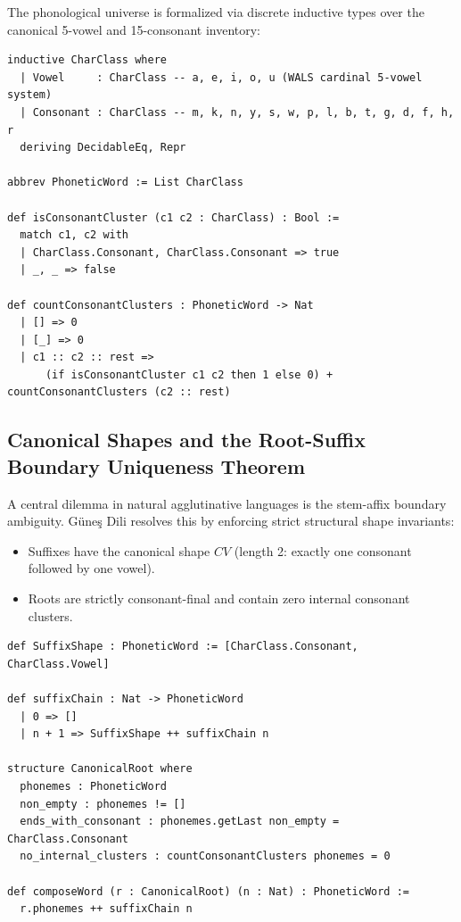 \documentclass[11pt,letterpaper]{article}
\begin{document}
The phonological universe is formalized via discrete inductive types over the canonical 5-vowel and 15-consonant inventory:
\begin{lstlisting}[language=Lean]
inductive CharClass where
  | Vowel     : CharClass -- a, e, i, o, u (WALS cardinal 5-vowel system)
  | Consonant : CharClass -- m, k, n, y, s, w, p, l, b, t, g, d, f, h, r
  deriving DecidableEq, Repr

abbrev PhoneticWord := List CharClass

def isConsonantCluster (c1 c2 : CharClass) : Bool :=
  match c1, c2 with
  | CharClass.Consonant, CharClass.Consonant => true
  | _, _ => false

def countConsonantClusters : PhoneticWord -> Nat
  | [] => 0
  | [_] => 0
  | c1 :: c2 :: rest =>
      (if isConsonantCluster c1 c2 then 1 else 0) + countConsonantClusters (c2 :: rest)
\end{lstlisting}

\subsection{Canonical Shapes and the Root-Suffix Boundary Uniqueness Theorem}

A central dilemma in natural agglutinative languages is the stem-affix boundary ambiguity. G\"{u}ne\c{s} Dili resolves this by enforcing strict structural shape invariants:
\begin{itemize}
    \item Suffixes have the canonical shape $C V$ (length 2: exactly one consonant followed by one vowel).
    \item Roots are strictly consonant-final and contain zero internal consonant clusters.
\end{itemize}

\begin{lstlisting}[language=Lean]
def SuffixShape : PhoneticWord := [CharClass.Consonant, CharClass.Vowel]

def suffixChain : Nat -> PhoneticWord
  | 0 => []
  | n + 1 => SuffixShape ++ suffixChain n

structure CanonicalRoot where
  phonemes : PhoneticWord
  non_empty : phonemes != []
  ends_with_consonant : phonemes.getLast non_empty = CharClass.Consonant
  no_internal_clusters : countConsonantClusters phonemes = 0

def composeWord (r : CanonicalRoot) (n : Nat) : PhoneticWord :=
  r.phonemes ++ suffixChain n
\end{lstlisting}
\end{document}
